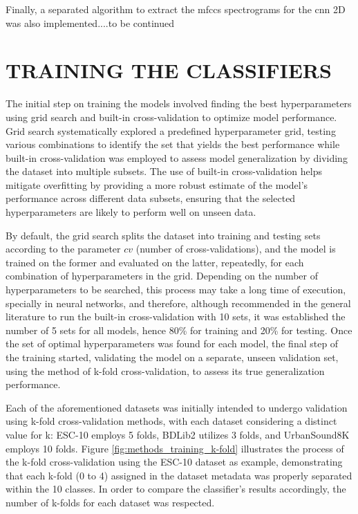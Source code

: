 Finally, a separated algorithm to extract the \gls{mfcc}s spectrograms for the \gls{cnn} 2D was also implemented....to be continued %


\section{TRAINING THE CLASSIFIERS}
\label{sec:methods_training_classifiers}

The initial step on training the models involved finding the best hyperparameters using grid search and built-in cross-validation \cite{scikitle61} to optimize model performance. Grid search systematically explored a predefined hyperparameter grid, testing various combinations to identify the set that yields the best performance while built-in cross-validation was employed to assess model generalization by dividing the dataset into multiple subsets. The use of built-in cross-validation helps mitigate overfitting by providing a more robust estimate of the model's performance across different data subsets, ensuring that the selected hyperparameters are likely to perform well on unseen data.

By default, the grid search splits the dataset into training and testing sets according to the parameter $cv$ (number of cross-validations), and the model is trained on the former and evaluated on the latter, repeatedly, for each combination of hyperparameters in the grid. Depending on the number of hyperparameters to be searched, this process may take a long time of execution, specially in neural networks, and therefore, although recommended in the general literature to run the built-in cross-validation with 10 sets, it was established the number of 5 sets for all models, hence 80\% for training and 20\% for testing. Once the set of optimal hyperparameters was found for each model, the final step of the training started, validating the model on a separate, unseen validation set, using the method of k-fold cross-validation, to assess its true generalization performance. 

Each of the aforementioned datasets was initially intended to undergo validation using k-fold cross-validation methods, with each dataset considering a distinct value for k: ESC-10 employs 5 folds, BDLib2 utilizes 3 folds, and UrbanSound8K employs 10 folds. Figure \ref{fig:methods_training_k-fold} illustrates the process of the k-fold cross-validation using the ESC-10 dataset as example, demonstrating that each k-fold (0 to 4) assigned in the dataset metadata was properly separated within the 10 classes. In order to compare the classifier's results accordingly, the number of k-folds for each dataset was respected.

